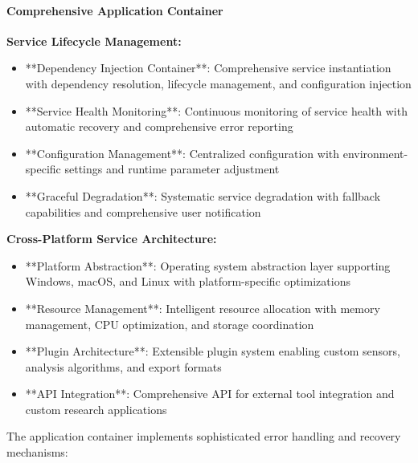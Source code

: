 \documentclass[11pt,a4paper]{report}
\begin{document}
\paragraph{Comprehensive Application Container}

\textbf{Service Lifecycle Management:}

\begin{itemize}
\item **Dependency Injection Container**: Comprehensive service instantiation with dependency resolution, lifecycle
  management, and configuration injection
\item **Service Health Monitoring**: Continuous monitoring of service health with automatic recovery and comprehensive error
  reporting
\item **Configuration Management**: Centralized configuration with environment-specific settings and runtime parameter
  adjustment
\item **Graceful Degradation**: Systematic service degradation with fallback capabilities and comprehensive user
  notification

\end{itemize}
\textbf{Cross-Platform Service Architecture:}

\begin{itemize}
\item **Platform Abstraction**: Operating system abstraction layer supporting Windows, macOS, and Linux with
  platform-specific optimizations
\item **Resource Management**: Intelligent resource allocation with memory management, CPU optimization, and storage
  coordination
\item **Plugin Architecture**: Extensible plugin system enabling custom sensors, analysis algorithms, and export formats
\item **API Integration**: Comprehensive API for external tool integration and custom research applications

\end{itemize}
The application container implements sophisticated error handling and recovery mechanisms:
\end{document}
